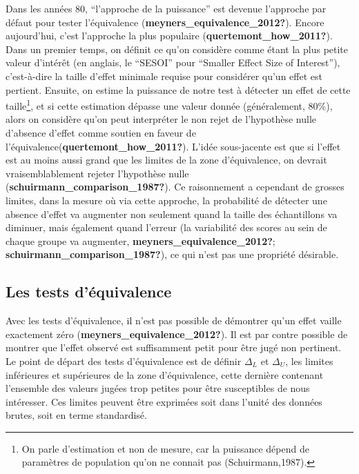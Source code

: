 \documentclass[
  english,
  man]{apa6}
\begin{document}
Dans les années 80, ``l'approche de la puissance'' est devenue l'approche par défaut pour tester l'équivalence (\textbf{meyners\_equivalence\_2012?}). Encore aujourd'hui, c'est l'approche la plus populaire (\textbf{quertemont\_how\_2011?}). Dans un premier temps, on définit ce qu'on considère comme étant la plus petite valeur d'intérêt (en anglais, le ``SESOI'' pour ``Smaller Effect Size of Interest''), c'est-à-dire la taille d'effet minimale requise pour considérer qu'un effet est pertient. Ensuite, on estime la puissance de notre test à détecter un effet de cette taille\footnote{On parle d'estimation et non de mesure, car la puissance dépend de paramètres de population qu'on ne connait pas (Schuirmann,1987).}, et si cette estimation dépasse une valeur donnée (généralement, 80\%), alors on considère qu'on peut interpréter le non rejet de l'hypothèse nulle d'absence d'effet comme soutien en faveur de l'équivalence(\textbf{quertemont\_how\_2011?}). L'idée sous-jacente est que si l'effet est au moins aussi grand que les limites de la zone d'équivalence, on devrait vraisemblablement rejeter l'hypothèse nulle (\textbf{schuirmann\_comparison\_1987?}). Ce raisonnement a cependant de grosses limites, dans la mesure où via cette approche, la probabilité de détecter une absence d'effet va augmenter non seulement quand la taille des échantillons va diminuer, mais également quand l'erreur (la variabilité des scores au sein de chaque groupe va augmenter, \textbf{meyners\_equivalence\_2012?}; \textbf{schuirmann\_comparison\_1987?}), ce qui n'est pas une propriété désirable.

\hypertarget{les-tests-duxe9quivalence}{%
\subsection{Les tests d'équivalence}\label{les-tests-duxe9quivalence}}

Avec les tests d'équivalence, il n'est pas possible de démontrer qu'un effet vaille exactement zéro (\textbf{meyners\_equivalence\_2012?}). Il est par contre possible de montrer que l'effet observé est suffisamment petit pour être jugé non pertinent. Le point de départ des tests d'équivalence est de définir \(\Delta_L\) et \(\Delta_U\), les limites inférieures et supérieures de la zone d'équivalence, cette dernière contenant l'ensemble des valeurs jugées trop petites pour être susceptibles de nous intéresser. Ces limites peuvent être exprimées soit dans l'unité des données brutes, soit en terme standardisé.
\end{document}
